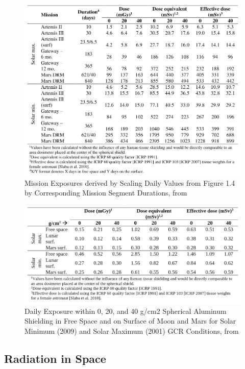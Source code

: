 \documentclass[12pt,a4paper]{report}
\begin{document}
\begin{figure}[hbtp]
\centering
\includegraphics[scale=.5]{img/extrapo.png}
\caption{Mission Exposures derived by Scaling Daily Values from Figure 1.4 by Corresponding Mission Segment Durations, from \cite{Hoffman1997}}
\end{figure}

\begin{figure}[hbtp]
\centering
\includegraphics[scale=.5]{img/data.png}
\caption{Daily Exposure within 0, 20, and 40 g/cm2 Spherical Aluminum Shielding in Free Space and on Surface of Moon and Mars for Solar Minimum (2009) and Solar Maximum (2001) GCR Conditions, from \cite{Hoffman1997}}
\end{figure}

\newpage

\subsection{Radiation in Space}
\end{document}
